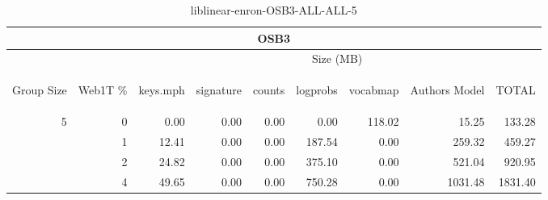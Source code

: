 \begin{center}
\begin{table}[htbp] 
 \begin{center}
\begin{tabular}{ | r | r | r | r | r | r | r | r | r |}
\hline
\multicolumn{9}{|c|}{OSB3}\\
\hline
 & & \multicolumn{7}{|c|}{Size (MB)}\\ \cline{3-9}
\begin{sideways}Group Size\end{sideways} & \begin{sideways}Web1T \% \end{sideways} & \begin{sideways}keys.mph\end{sideways} & \begin{sideways}signature\end{sideways} & \begin{sideways}counts\end{sideways} & \begin{sideways}logprobs\end{sideways} & \begin{sideways}vocabmap\end{sideways} & \begin{sideways}Authors Model \end{sideways} & \begin{sideways}TOTAL\end{sideways}\\
\hline
\multirow{3}{*}{5}
 & 0 & 0.00 & 0.00 & 0.00 & 0.00 & 118.02 & 15.25 & 133.28\\ \cline{2-9}
 & 1 & 12.41 & 0.00 & 0.00 & 187.54 & 0.00 & 259.32 & 459.27\\ \cline{2-9}
 & 2 & 24.82 & 0.00 & 0.00 & 375.10 & 0.00 & 521.04 & 920.95\\ \cline{2-9}
 & 4 & 49.65 & 0.00 & 0.00 & 750.28 & 0.00 & 1031.48 & 1831.40\\ \cline{2-9}
\hline
\end{tabular}
\caption{liblinear-enron-OSB3-ALL-ALL-5}
\label{table:liblinear-enron-OSB3-ALL-ALL-5}
\end{center}
 \end{table}
\end{center}

